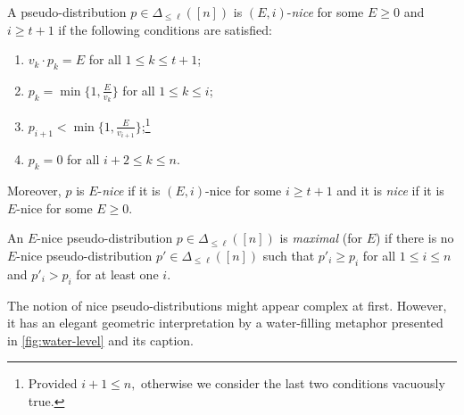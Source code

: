 \documentclass[sigconf,nonacm]{aamas}
\begin{document}
\begin{definition} A pseudo-distribution $p \in \Delta_{\leq \ell}([n])$ is $(E, i)$-\emph{nice} for some $E \geq 0$ and $i \geq t + 1$ if the following conditions are satisfied:
\begin{enumerate}
    \item $v_k \cdot p_k = E$ for all $1 \leq k \leq t + 1$;
    \item $p_k = \min\{1, \frac{E}{v_k}\}$ for all $1 \leq k \leq i$;
    \item $p_{i + 1} < \min\{1, \frac{E}{v_{i + 1}}\}$;\footnote{Provided $i + 1 \leq n,$ otherwise we consider the last two conditions vacuously true.}
    \item $p_k = 0$ for all $i + 2 \leq k \leq n.$
\end{enumerate}
Moreover, $p$ is $E$-\emph{nice} if it is $(E, i)$-nice for some $i \geq t + 1$ and it is \emph{nice} if it is $E$-nice for some $E \geq 0$.

An $E$-nice pseudo-distribution $p \in \Delta_{\leq \ell}([n])$ is \emph{maximal} (for $E$) if there is no $E$-nice pseudo-distribution $p' \in \Delta_{\leq \ell}([n])$ such that $p'_i \geq p_i$ for all $1 \leq i \leq n$ and $p'_i > p_i$ for at least one $i.$
\end{definition}

The notion of nice pseudo-distributions might appear complex at first. However, it has an elegant geometric interpretation by a water-filling metaphor presented in \cref{fig:water-level} and its caption.
\end{document}
